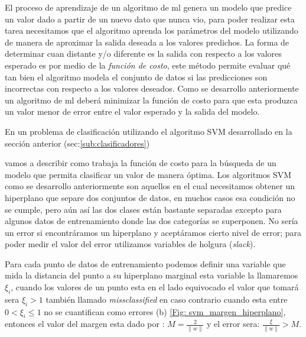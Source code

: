 
El proceso de aprendizaje de un algoritmo de \ac{ml} genera un  modelo que predice un valor dado a partir de un nuevo dato que nunca vio, para poder realizar esta tarea necesitamos que el algoritmo aprenda los parámetros del modelo utilizando de manera de aproximar la salida deseada a los valores predichos. La forma de determinar cuan distante y/o diferente es la salida con respecto a los valores esperado es por medio de la \textit{función de costo}, este método permite evaluar qué tan bien el algoritmo modela el conjunto de datos si las predicciones son incorrectas con respecto a los valores deseados. Como se desarrollo anteriormente un algoritmo de \ac{ml} deberá minimizar la función de costo para que esta produzca un valor menor de error entre el valor esperado y la salida del modelo.

En un problema de clasificación utilizando  el algoritmo SVM desarrollado en la sección anterior (sec:\ref{sub:clasificadores}) 




vamos a describir como trabaja la función de costo para la búsqueda  de un modelo que permita clasificar un valor de manera óptima. Los algoritmos SVM como se desarrollo anteriormente son aquellos en el cual necesitamos obtener un hiperplano que separe  dos conjuntos de datos, en  muchos casos esa condición no se cumple, pero aún así las dos clases están bastante separadas excepto para algunos datos de entrenamiento  donde las dos categorías se superponen. No sería un error si encontráramos un hiperplano y aceptáramos cierto nivel de error; para poder medir el valor del error  utilizamos variables de holgura (\emph{slack}).

Para cada punto de datos de entrenamiento podemos definir una variable que mida la distancia del punto a su hiperplano marginal  esta variable la llamaremos  $\xi _i$, cuando los valores de un punto esta en el lado equivocado el valor que tomará sera $ \xi_i > 1$ también llamado \textit{missclassified} en caso contrario cuando esta entre $ 0 < \xi_i \leq 1 $ no se cuantifican como errores (b) \ref{Fig: svm_margen_hiperplano}, entonces el valor del  margen esta dado por : $ M  = \frac{2}{ \|w \|} $  y el error sera:  $ \frac{ \xi}{ \|w \|} >  M$.


